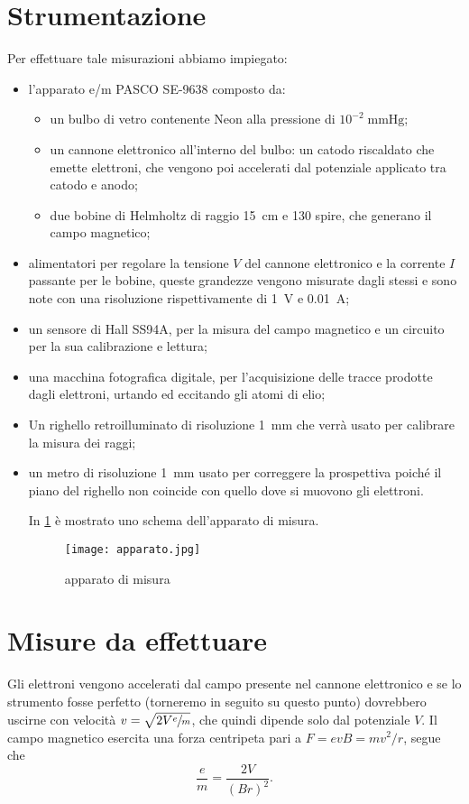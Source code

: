 \section{Strumentazione}
	Per effettuare tale misurazioni abbiamo impiegato:

	\begin{itemize}
		\item l'apparato e/m PASCO SE-9638 composto da:
		\begin{itemize}
			\item un bulbo di vetro contenente Neon alla pressione di $10^{-2} \; \si{\mmHg}$;
			\item un cannone elettronico all'interno del bulbo: un catodo riscaldato che emette elettroni, che vengono poi accelerati dal potenziale applicato tra catodo e anodo;
			\item due bobine di Helmholtz di raggio \SI{15}{cm} e 130 spire, che generano il campo magnetico;
		\end{itemize}
		\item alimentatori per regolare la tensione $V$ del cannone elettronico e la corrente $I$ passante per le bobine, queste grandezze vengono misurate dagli stessi e sono note con una risoluzione rispettivamente di \SI{1}{V} e $ $\SI{0.01}{\ampere};
		\item un sensore di Hall SS94A, per la misura del campo magnetico e un circuito per la sua calibrazione e lettura;
		\item una macchina fotografica digitale, per l'acquisizione delle tracce prodotte dagli elettroni, urtando ed eccitando gli atomi di elio;
		\item Un righello retroilluminato di risoluzione \SI{1}{\mm} che verrà usato per calibrare la misura dei raggi;
		\item un metro di risoluzione \SI{1}{\mm} usato per correggere la prospettiva poiché il piano del righello non coincide con quello dove si muovono gli elettroni.

In \figurename{ \ref{apparato}} è mostrato uno schema dell'apparato di misura.

	\begin{figure}[H]
		\centering
		\texttt{[image: apparato.jpg]}
		\caption{apparato di misura}
		\label{apparato}
	\end{figure}

	\end{itemize}

\section{Misure da effettuare}
Gli elettroni vengono accelerati dal campo presente nel cannone elettronico e se lo strumento fosse perfetto (torneremo in seguito su questo punto) dovrebbero uscirne con velocità $v = \sqrt{2V \sfrac{e}{m} }$, che quindi dipende solo dal potenziale $V$.
Il campo magnetico esercita una forza centripeta pari a $F = evB = mv^2/r$, segue che $$\frac{e}{m}=\frac{2V}{(B r)^2}.$$

